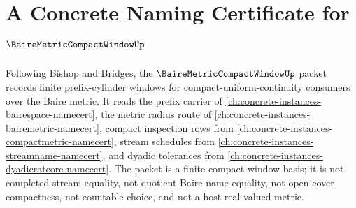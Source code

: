 \chapter{A Concrete Naming Certificate for $\BaireMetricCompactWindowUp$}
\label{ch:concrete-instances-baire-metric-compact-window-namecert}

Following Bishop and Bridges, the $\BaireMetricCompactWindowUp$ packet records finite prefix-cylinder windows for compact-uniform-continuity consumers over the Baire metric. It reads the prefix carrier of \autoref{ch:concrete-instances-bairespace-namecert}, the metric radius route of \autoref{ch:concrete-instances-bairemetric-namecert}, compact inspection rows from \autoref{ch:concrete-instances-compactmetric-namecert}, stream schedules from \autoref{ch:concrete-instances-streamname-namecert}, and dyadic tolerances from \autoref{ch:concrete-instances-dyadicratcore-namecert}. The packet is a finite compact-window basis; it is not completed-stream equality, not quotient Baire-name equality, not open-cover compactness, not countable choice, and not a host real-valued metric.

